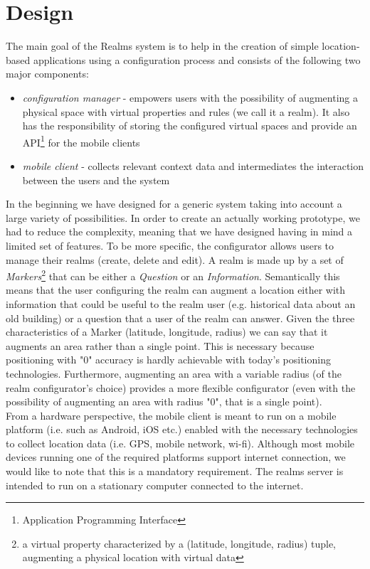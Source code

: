 \section{Design} %
\label{sec:design}
The main goal of the Realms system is to help in the creation of simple location-based applications using a configuration process and consists of the following two major components:
\begin{itemize}
	\item \emph{configuration manager} - empowers users with the possibility of augmenting a physical space with virtual properties and rules (we call it a realm). It also has the responsibility of storing the configured virtual spaces and provide an API\footnote{Application Programming Interface} for the mobile clients
	\item \emph{mobile client} - collects relevant context data and intermediates the interaction between the users and the system
\end{itemize}

\noindent In the beginning we have designed for a generic system taking into account a large variety of possibilities. In order to create an actually working prototype, we had to reduce the complexity, meaning that we have designed having in mind a limited set of features. To be more specific, the configurator allows users to manage their realms (create, delete and edit). A realm is made up by a set of \emph{Markers}\footnote{a virtual property characterized by a (latitude, longitude, radius) tuple, augmenting a physical location with virtual data} that can be either a \emph{Question} or an \emph{Information}. Semantically this means that the user configuring the realm can augment a location either with information that could be useful to the realm user (e.g. historical data about an old building)  or a question that a user of the realm can answer. Given the three characteristics of a Marker (latitude, longitude, radius) we can say that it augments an area rather than a single point. This is necessary because positioning with "0" accuracy is hardly achievable with today's positioning technologies. Furthermore, augmenting an area with a variable radius (of the realm configurator's choice) provides a more flexible configurator (even with the possibility of augmenting an area with radius "0", that is a single point).
\\

\noindent From a hardware perspective, the mobile client is meant to run on a mobile platform (i.e. such as Android, iOS etc.) enabled with the necessary technologies to collect location data (i.e. GPS, mobile network, wi-fi). Although most mobile devices running one of the required platforms support internet connection, we would like to note that this is a mandatory requirement. The realms server is intended to run on a stationary computer connected to the internet.
\\

